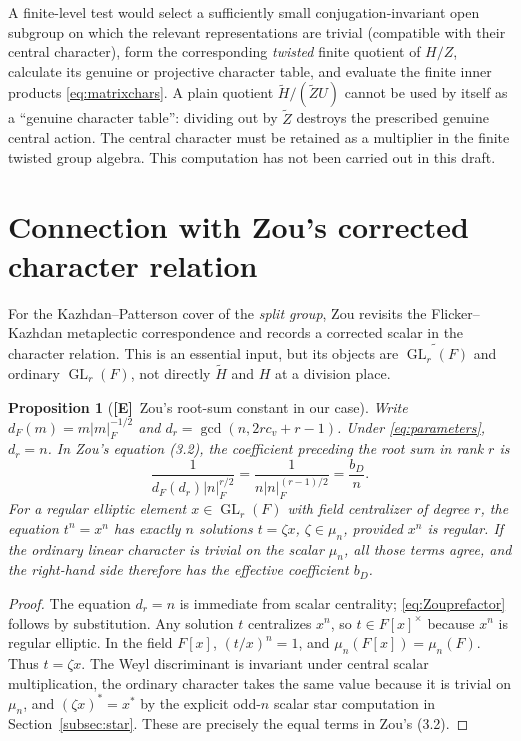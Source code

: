 \documentclass[11pt]{article}
\newcommand{\GL}{\operatorname{GL}}
\newcommand{\tH}{\widetilde H}
\newcommand{\tZ}{\widetilde Z}
\newcommand{\Etag}{\textnormal{\textbf{[E]}}}
\theoremstyle{plain}
\newtheorem{proposition}[theorem]{Proposition}
\theoremstyle{definition}
\begin{document}
A finite-level test would select a sufficiently small
conjugation-invariant open subgroup on which the relevant
representations are trivial (compatible with their central
character), form the corresponding \emph{twisted} finite quotient
of $H/Z$, calculate its genuine or projective character table,
and evaluate the finite inner products \eqref{eq:matrixchars}.
A plain quotient $\tH/(\tZ U)$ cannot be used by itself as a
``genuine character table'': dividing out by $\tZ$ destroys the
prescribed genuine central action.  The central character must be
retained as a multiplier in the finite twisted group algebra.
This computation has not been carried out in this draft.

\section{Connection with Zou's corrected character relation}\label{sec:Zou}
For the Kazhdan--Patterson cover of the \emph{split group},
Zou \cite[\S3]{Zou24} revisits the Flicker--Kazhdan metaplectic
correspondence and records a corrected scalar in the character
relation.  This is an essential input, but its objects are
$\widetilde{\GL_r(F)}$ and ordinary $\GL_r(F)$, not directly
$\tH$ and $H$ at a division place.

\begin{proposition}[\Etag\ Zou's root-sum constant in our case]\label{prop:Zouconstant}
Write $d_F(m)=m|m|_F^{-1/2}$ and
$d_r=\gcd(n,2rc_v+r-1)$.  Under \eqref{eq:parameters},
$d_r=n$.  In Zou's equation (3.2), the coefficient preceding
the root sum in rank $r$ is
\begin{equation}\label{eq:Zouprefactor}
 \frac{1}{d_F(d_r)|n|_F^{r/2}}
 =\frac{1}{n|n|_F^{(r-1)/2}}=\frac{b_D}{n}.
\end{equation}
For a regular elliptic element $x\in\GL_r(F)$ with field
centralizer of degree $r$, the equation $t^n=x^n$ has exactly
$n$ solutions $t=\zeta x$, $\zeta\in\mu_n$, provided $x^n$ is
regular.  If the ordinary linear character is trivial on the
scalar $\mu_n$, all those terms agree, and the right-hand side
therefore has the effective coefficient $b_D$.
\end{proposition}
\begin{proof}
The equation $d_r=n$ is immediate from scalar centrality;
\eqref{eq:Zouprefactor} follows by substitution.  Any solution
$t$ centralizes $x^n$, so $t\in F[x]^\times$ because $x^n$
is regular elliptic.  In the field $F[x]$, $(t/x)^n=1$,
and $\mu_n(F[x])=\mu_n(F)$.  Thus $t=\zeta x$.
The Weyl discriminant is invariant under central scalar
multiplication, the ordinary character takes the same value
because it is trivial on $\mu_n$, and $(\zeta x)^*=x^*$
by the explicit odd-$n$ scalar star computation in
Section~\ref{subsec:star}.
These are precisely the equal terms in Zou's (3.2).
\end{proof}
\end{document}
